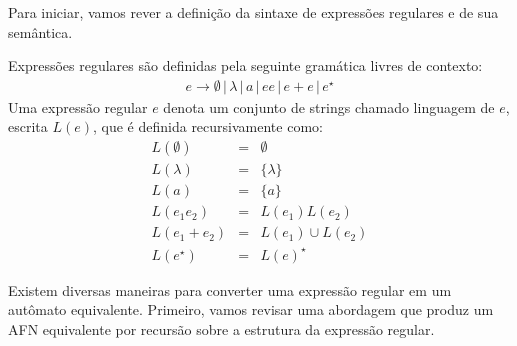 Para iniciar, vamos rever a definição da sintaxe de expressões
regulares e de sua semântica.

\begin{Definition}
  Expressões regulares são definidas pela seguinte
  gramática livres de contexto: \[
    \begin{array}{l}
      e \to \emptyset\,|\,\lambda\,|\,a\,|\,e e\,|\,e + e\,|\,e^\star
    \end{array}
  \] Uma expressão regular \(e\) denota um conjunto de strings
  chamado linguagem de \(e\), escrita \(L(e)\), que é definida
  recursivamente como: \[
    \begin{array}{lcl}
      L(\emptyset) & = & \emptyset\\
      L(\lambda) & = & \{\lambda\}\\
      L(a)        & = & \{a\}\\
      L(e_1 e_2)  & = & L(e_1)L(e_2)\\
      L(e_1 + e_2) & = & L(e_1) \cup L(e_2)\\
      L(e^\star)  & = & L(e)^\star
    \end{array}
  \]
\end{Definition}

Existem diversas maneiras para converter uma expressão regular em um
autômato equivalente. Primeiro, vamos revisar uma abordagem que
produz um AFN equivalente por recursão sobre a estrutura da expressão regular.

